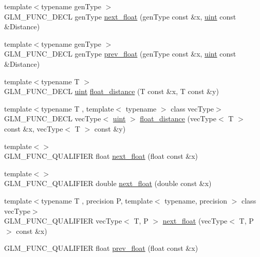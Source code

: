 \begin{DoxyCompactItemize}
{\footnotesize template$<$typename gen\+Type $>$ }\\G\+L\+M\+\_\+\+F\+U\+N\+C\+\_\+\+D\+E\+C\+L gen\+Type \hyperlink{group__gtc__ulp_gad107ec3d9697ef82032a33338a73ebdd}{next\+\_\+float} (gen\+Type const \&x, \hyperlink{stb__image_8c_a91ad9478d81a7aaf2593e8d9c3d06a14}{uint} const \&Distance)
\item 
{\footnotesize template$<$typename gen\+Type $>$ }\\G\+L\+M\+\_\+\+F\+U\+N\+C\+\_\+\+D\+E\+C\+L gen\+Type \hyperlink{group__gtc__ulp_gaa399d5b6472a70e8952f9b26ecaacdec}{prev\+\_\+float} (gen\+Type const \&x, \hyperlink{stb__image_8c_a91ad9478d81a7aaf2593e8d9c3d06a14}{uint} const \&Distance)
\item 
{\footnotesize template$<$typename T $>$ }\\G\+L\+M\+\_\+\+F\+U\+N\+C\+\_\+\+D\+E\+C\+L \hyperlink{stb__image_8c_a91ad9478d81a7aaf2593e8d9c3d06a14}{uint} \hyperlink{group__gtc__ulp_ga2e09bd6c8b0a9c91f6f5683d68245634}{float\+\_\+distance} (T const \&x, T const \&y)
\item 
{\footnotesize template$<$typename T , template$<$ typename $>$ class vec\+Type$>$ }\\G\+L\+M\+\_\+\+F\+U\+N\+C\+\_\+\+D\+E\+C\+L vec\+Type$<$ \hyperlink{stb__image_8c_a91ad9478d81a7aaf2593e8d9c3d06a14}{uint} $>$ \hyperlink{group__gtc__ulp_ga85355f2549d75789eb66e5d565d8ad26}{float\+\_\+distance} (vec\+Type$<$ T $>$ const \&x, vec\+Type$<$ T $>$ const \&y)
\item 
{\footnotesize template$<$$>$ }\\G\+L\+M\+\_\+\+F\+U\+N\+C\+\_\+\+Q\+U\+A\+L\+I\+F\+I\+E\+R float \hyperlink{namespaceglm_a094d145a4ae8efb9e42e88883cfb15f1}{next\+\_\+float} (float const \&x)
\item 
{\footnotesize template$<$$>$ }\\G\+L\+M\+\_\+\+F\+U\+N\+C\+\_\+\+Q\+U\+A\+L\+I\+F\+I\+E\+R double \hyperlink{namespaceglm_a451149113e1a5083fcba0546de81ad51}{next\+\_\+float} (double const \&x)
\item 
{\footnotesize template$<$typename T , precision P, template$<$ typename, precision $>$ class vec\+Type$>$ }\\G\+L\+M\+\_\+\+F\+U\+N\+C\+\_\+\+Q\+U\+A\+L\+I\+F\+I\+E\+R vec\+Type$<$ T, P $>$ \hyperlink{namespaceglm_a7e678a59e625a9453c8847e3d0e01625}{next\+\_\+float} (vec\+Type$<$ T, P $>$ const \&x)
\item 
G\+L\+M\+\_\+\+F\+U\+N\+C\+\_\+\+Q\+U\+A\+L\+I\+F\+I\+E\+R float \hyperlink{namespaceglm_a1fd407652d7ccfbe810674a2e5cbc8eb}{prev\+\_\+float} (float const \&x)

\end{DoxyCompactItemize}
